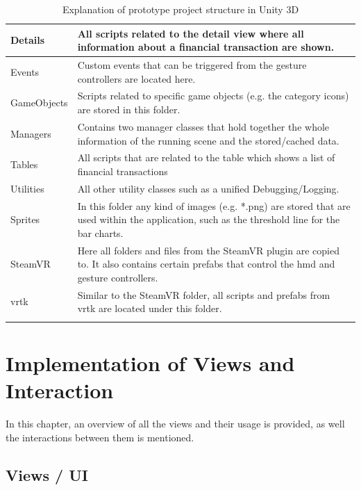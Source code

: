 \begin{longtable}{ | p{3cm} | p{11cm} |}
	\hline
		\textrightarrow{} Details &
		All scripts related to the detail view where all information about a financial transaction are shown. \\
	\hline
		\textrightarrow{} Events &
		Custom events that can be triggered from the gesture controllers are located here. \\
	\hline
		\textrightarrow{} GameObjects &
		Scripts related to specific game objects (e.g. the category icons) are stored in this folder. \\
	\hline
		\textrightarrow{} Managers &
		Contains two manager classes that hold together the whole information of the running scene and the stored/cached data. \\
	\hline
		\textrightarrow{} Tables &
		All scripts that are related to the table which shows a list of financial transactions \\
	\hline
		\textrightarrow{} Utilities &
		All other utility classes such as a unified Debugging/Logging. \\
	\hline
		Sprites &
		In this folder any kind of images (e.g. *.png) are stored that are used within the application, such as the threshold line for the bar charts. \\
	\hline
		SteamVR &
		Here all folders and files from the SteamVR plugin are copied to. It also contains certain prefabs that control the \gls{hmd} and gesture controllers. \\
	\hline
		\gls{vrtk} &
		Similar to the SteamVR folder, all scripts and prefabs from \gls{vrtk} are located under this folder. \\
	\hline
	\caption{Explanation of prototype project structure in Unity 3D}
	\label{tbl:codestructuredesc}
\end{longtable}



\section{Implementation of Views and Interaction}

In this chapter, an overview of all the views and their usage is provided, as well the interactions between them is mentioned.

\subsection{Views / UI}

